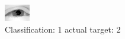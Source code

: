 \begin{figure}[h!]
\begin{center}
\includegraphics[width=0.60\columnwidth]{figures/ID2235_class_1_target_2.png}
\end{center}
\caption{ Classification: 1 actual target: 2}
\label{fig:ID2235_class_1_target_2}
\end{figure}
